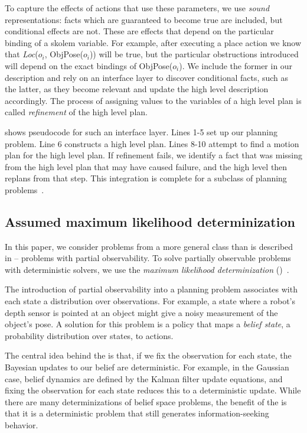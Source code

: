 To capture the effects of actions that use these parameters, we use
\emph{sound} representations: facts which are guaranteed to become
true are included, but conditional effects are not. These are effects
that depend on the particular binding of a skolem variable. For
example, after executing a place action we know that \emph{Loc}($o_i$,
ObjPose($o_i$)) will be true, but the particular obstructions introduced
will depend on the exact bindings of ObjPose($o_i$). We include the
former in our description and rely on an interface layer to discover
conditional facts, such as the latter, as they become relevant and update the high level
description accordingly. The process of assigning values to the variables
of a high level plan is called \emph{refinement} of the high level
plan.

 shows pseudocode for such an interface layer. Lines
1-5 set up our planning problem. Line 6 constructs a high level
plan. Lines 8-10 attempt to find a motion plan for the high level
plan. If refinement fails, we identify a fact that was missing from
the high level plan that may have caused failure, and the high level then
replans from that step.
This integration is complete for a subclass of planning
problems~\cite{srivastava2014combined}.



\subsection{Assumed maximum likelihood determinization}
In this paper, we consider problems from a more general class than is
described in  -- problems with partial
observability. To solve partially observable problems with
deterministic solvers, we use the \emph{maximum
  likelihood determinization} (\mld)~\cite{platt2010belief}.

The introduction of partial observability into a planning problem
associates with each state a distribution over observations. For
example, a state where a robot's depth sensor is pointed at an object
might give a noisy measurement of the object's pose. A solution for
this problem is a policy that maps a \emph{belief state}, a
probability distribution over states, to actions.

The central idea behind the \mld{} is that, if we fix the observation
for each state, the Bayesian updates to our belief are
deterministic. For example, in the Gaussian case, belief dynamics are
defined by the Kalman filter update equations, and fixing the
observation for each state reduces this to a deterministic
update. While there are many determinizations of belief space
problems, the benefit of the \mld{} is that it is a deterministic
problem that still generates information-seeking behavior.

